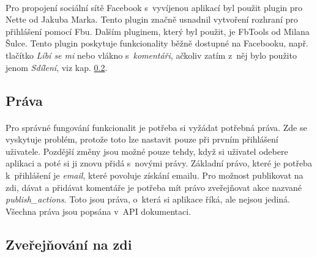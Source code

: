 \documentclass[11pt,a4paper,titlepage,oneside]{book}
\begin{document}

				\paragraph{} Pro propojení sociální sítě Facebook s~vyvíjenou aplikací byl použit plugin pro Nette\cite{nette20login} od Jakuba Marka. Tento plugin značně usnadnil vytvoření rozhraní pro přihlášení pomocí \acl{Fb}u. Dalším pluginem, který byl použit, je FbTools\cite{FbTools} od Milana Šulce. Tento plugin poskytuje funkcionality běžně dostupné na Facebooku, např. tlačítko \textit{Líbí se mi} nebo vlákno s~\textit{komentáři}, ačkoliv zatím z~něj bylo použito jenom \textit{Sdílení}, viz kap. \ref{sec:sdileni}.
			\subsection{Práva}
				\paragraph{} Pro správné fungování funkcionalit je potřeba si vyžádat potřebná  práva. Zde se vyskytuje problém, protože toto lze nastavit pouze při prvním přihlá\-šení uživatele. Pozdější změny jsou možné pouze tehdy, když si uživatel odebere aplikaci a poté si ji znovu přidá s~novými právy. Základní právo, které je potřeba k~přihlášení je \textit{email}, které povoluje získání emailu. Pro možnost publikovat na zdi, dávat  a přidávat komentáře je potřeba mít právo zveřejňovat akce nazvané \textit{publish\_actions}. Toto jsou práva, o~která si aplikace říká, ale nejsou jediná. Všechna práva jsou popsána v~API dokumentaci\cite{FbApiPrava}.
			\subsection{Zveřejňování na zdi}
				\label{sec:sdileni}
\end{document}
